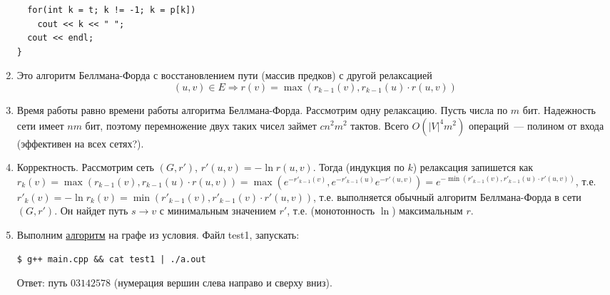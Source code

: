 \documentclass[a4paper]{article}
\begin{document}
\begin{enumerate}
\begin{lstlisting}
  for(int k = t; k != -1; k = p[k])
    cout << k << " ";
  cout << endl;
}
\end{lstlisting}
\item Это алгоритм Беллмана-Форда с восстановлением пути (массив предков) с другой релаксацией $$(u,v)\in E\Rightarrow r(v)=\max (r_{k-1}(v),r_{k-1}(u)\cdot r(u,v))$$
\item Время работы равно времени работы алгоритма Беллмана-Форда. Рассмотрим одну релаксацию. Пусть числа по $m$ бит. Надежность сети имеет $nm$ бит, поэтому перемножение двух таких чисел займет $cn^2m^2$ тактов. Всего $O(|V|^4m^2)$ операций~--- полином от входа (эффективен на всех сетях?).
\item Корректность. Рассмотрим сеть $(G,r')$, $r'(u,v)=-\ln r(u,v)$. Тогда (индукция по $k$) релаксация запишется как $r_k(v)=\max (r_{k-1}(v),r_{k-1}(u)\cdot r(u,v))=\max (e^{-r'_{k-1}(v)},e^{-r'_{k-1}(u)}e^{-r'(u,v)})=e^{-\min(r'_{k-1}(v),r'_{k-1}(u)\cdot r'(u,v))}$, т.е. $r'_k(v)=-\ln r_k(v)=\min(r'_{k-1}(v),r'_{k-1}(v)\cdot r'(u,v))$, т.е. выполняется обычный алгоритм Беллмана-Форда в сети $(G,r')$. Он найдет путь $s\to v$ с минимальным значением $r'$, т.е. (монотонность $\ln$) максимальным $r$.
\item Выполним \href{https://bitbucket.org/etoestja/inf/raw/HEAD/mipt/s4/AACM/C/51/main.cpp}{алгоритм} на графе из условия. Файл test1, запускать: \begin{verbatim}
$ g++ main.cpp && cat test1 | ./a.out \end{verbatim}
Ответ: путь $0 3 1 4 2 5 7 8$ (нумерация вершин слева направо и сверху вниз).
\end{enumerate}
\end{document}
